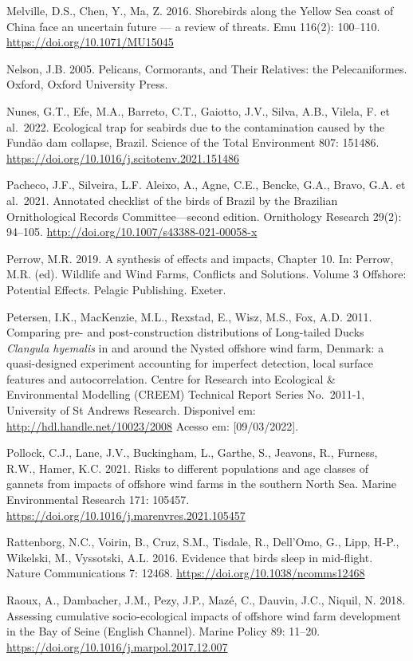 \documentclass[
  oneside]{scrbook}
\begin{document}
Melville, D.S., Chen, Y., Ma, Z. 2016. Shorebirds along the Yellow Sea coast of China face an uncertain future --- a review of threats. Emu 116(2): 100--110. \url{https://doi.org/10.1071/MU15045}

Nelson, J.B. 2005. Pelicans, Cormorants, and Their Relatives: the Pelecaniformes. Oxford, Oxford University Press.

Nunes, G.T., Efe, M.A., Barreto, C.T., Gaiotto, J.V., Silva, A.B., Vilela, F. et al.~2022. Ecological trap for seabirds due to the contamination caused by the Fundão dam collapse, Brazil. Science of the Total Environment 807: 151486. \url{https://doi.org/10.1016/j.scitotenv.2021.151486}

Pacheco, J.F., Silveira, L.F. Aleixo, A., Agne, C.E., Bencke, G.A., Bravo, G.A. et al.~2021. Annotated checklist of the birds of Brazil by the Brazilian Ornithological Records Committee---second edition. Ornithology Research 29(2): 94--105. \url{http://doi.org/10.1007/s43388-021-00058-x}

Perrow, M.R. 2019. A synthesis of effects and impacts, Chapter 10. In: Perrow, M.R. (ed). Wildlife and Wind Farms, Conflicts and Solutions. Volume 3 Offshore: Potential Effects. Pelagic Publishing. Exeter.

Petersen, I.K., MacKenzie, M.L., Rexstad, E., Wisz, M.S., Fox, A.D. 2011. Comparing pre- and post-construction distributions of Long-tailed Ducks \emph{Clangula hyemalis} in and around the Nysted offshore wind farm, Denmark: a quasi-designed experiment accounting for imperfect detection, local surface features and autocorrelation. Centre for Research into Ecological \& Environmental Modelling (CREEM) Technical Report Series No.~2011-1, University of St Andrews Research. Disponivel em: \url{http://hdl.handle.net/10023/2008} Acesso em: {[}09/03/2022{]}.

Pollock, C.J., Lane, J.V., Buckingham, L., Garthe, S., Jeavons, R., Furness, R.W., Hamer, K.C. 2021. Risks to different populations and age classes of gannets from impacts of offshore wind farms in the southern North Sea. Marine Environmental Research 171: 105457. \url{https://doi.org/10.1016/j.marenvres.2021.105457}

Rattenborg, N.C., Voirin, B., Cruz, S.M., Tisdale, R., Dell'Omo, G., Lipp, H-P., Wikelski, M., Vyssotski, A.L. 2016. Evidence that birds sleep in mid-flight. Nature Communications 7: 12468. \url{https://doi.org/10.1038/ncomms12468}

Raoux, A., Dambacher, J.M., Pezy, J.P., Mazé, C., Dauvin, J.C., Niquil, N. 2018. Assessing cumulative socio-ecological impacts of offshore wind farm development in the Bay of Seine (English Channel). Marine Policy 89: 11--20. \url{https://doi.org/10.1016/j.marpol.2017.12.007}
\end{document}

